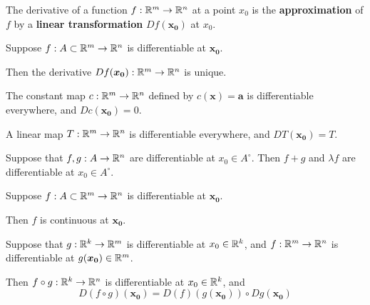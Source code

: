 \begin{remark}
    The derivative of a function $f : \mathbb{R}^m \to \mathbb{R}^n$ at a point $x_0$ is the \textbf{approximation} of $f$ by a \textbf{linear transformation} $Df(\bm{x_0})$ at $x_0$.
    \end{remark}

    \begin{proposition}[Uniqueness]
    Suppose $f : A \subset \mathbb{R}^m \to \mathbb{R}^n$ is differentiable at $\bm{x_0}$.
       
    \vspace{1em}
    Then the derivative $Df(\bm{x_0}) : \mathbb{R}^m \to \mathbb{R}^n$ is unique.
    \end{proposition}

    \begin{example}        
The constant map $c: \mathbb{R}^m \to \mathbb{R}^n$ defined by $c(\bm{x}) = \bm{a}$ is differentiable everywhere, and $Dc(\bm{x_0}) = 0$.
    \end{example}

    \begin{example}\label{derivlinearmap}
    A linear map $T: \mathbb{R}^m \to \mathbb{R}^n$ is differentiable everywhere, and $DT(\bm{x_0}) = T$.
    \end{example}

    \begin{proposition}
Suppose that $f, g : A \to \mathbb{R}^n$ are differentiable at $x_0  \in A^\circ$. Then $f+g$ and $\lambda f$ are differentiable at $x_0 \in A^\circ$.
\end{proposition}

    \begin{proposition}
    Suppose $f : A \subset \mathbb{R}^m \to \mathbb{R}^n$ is differentiable at $\bm{x_0}$. 
    
    \vspace{1em}
    Then $f$ is continuous at $\bm{x_0}$.
    \end{proposition}

    \begin{theorem}
    Suppose that $g: \mathbb{R}^k \to \mathbb{R}^m$ is differentiable at $x_0 \in \mathbb{R}^k$, and $f : \mathbb{R}^m \to \mathbb{R}^n$ is differentiable at $g(\bm{x_0}) \in \mathbb{R}^m$.  
    
    \vspace{1em}
    
    Then $f \circ g : \mathbb{R}^k \to \mathbb{R}^n$ is differentiable at $x_0 \in \mathbb{R}^k$, and 
    $$D(f \circ g)(\bm{x_0}) = D(f)(g(\bm{x_0})) \circ Dg(\bm{x_0})$$
    
    \end{theorem}


